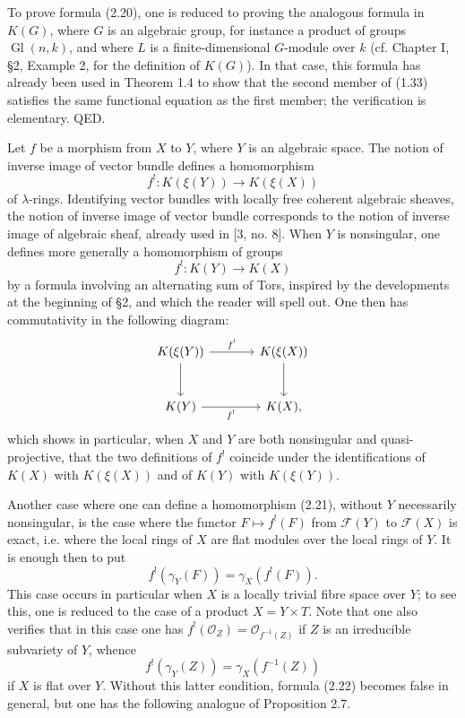 \documentclass[11pt]{article}
\providecommand{\cF}{\mathscr F}
\providecommand{\cO}{\mathcal O}
\begin{document}
To prove formula (2.20), one is reduced to proving the analogous formula in $K(G)$, where $G$ is an algebraic group, for instance a product of groups $\operatorname{Gl}(n,k)$, and where $L$ is a finite-dimensional $G$-module over $k$ (cf. Chapter I, \S 2, Example 2, for the definition of $K(G)$). In that case, this formula has already been used in Theorem 1.4 to show that the second member of (1.33) satisfies the same functional equation as the first member; the verification is elementary. QED.

Let $f$ be a morphism from $X$ to $Y$, where $Y$ is an algebraic space. The notion of inverse image of vector bundle defines a homomorphism
\[
 f^!:K(\xi(Y))\longrightarrow K(\xi(X))
\]
of $\lambda$-rings. Identifying vector bundles with locally free coherent algebraic sheaves, the notion of inverse image of vector bundle corresponds to the notion of inverse image of algebraic sheaf, already used in [3, no. 8]. When $Y$ is nonsingular, one defines more generally a homomorphism of groups
\begin{equation}\tag{2.21}
 f^!:K(Y)\longrightarrow K(X)
\end{equation}
by a formula involving an alternating sum of Tors, inspired by the developments at the beginning of \S 2, and which the reader will spell out. One then has commutativity in the following diagram:
\[
\begin{tikzcd}[column sep=large,row sep=large]
K(\xi(Y)) \arrow[r,"f^!"] \arrow[d] & K(\xi(X)) \arrow[d]\\
K(Y) \arrow[r,"f^!"'] & K(X),
\end{tikzcd}
\]
which shows in particular, when $X$ and $Y$ are both nonsingular and quasi-projective, that the two definitions of $f^!$ coincide under the identifications of $K(X)$ with $K(\xi(X))$ and of $K(Y)$ with $K(\xi(Y))$.

Another case where one can define a homomorphism (2.21), without $Y$ necessarily nonsingular, is the case where the functor $F\mapsto f^!(F)$ from $\cF(Y)$ to $\cF(X)$ is exact, i.e. where the local rings of $X$ are flat modules over the local rings of $Y$. It is enough then to put
\[
 f^!(\gamma_Y(F))=\gamma_X(f^!(F)).
\]
This case occurs in particular when $X$ is a locally trivial fibre space over $Y$; to see this, one is reduced to the case of a product $X=Y\times T$. Note that one also verifies that in this case one has $f^!(\cO_Z)=\cO_{f^{-1}(Z)}$ if $Z$ is an irreducible subvariety of $Y$, whence
\begin{equation}\tag{2.22}
 f^!(\gamma_Y(Z))=\gamma_X(f^{-1}(Z))
\end{equation}
if $X$ is flat over $Y$. Without this latter condition, formula (2.22) becomes false in general, but one has the following analogue of Proposition 2.7.
\end{document}
